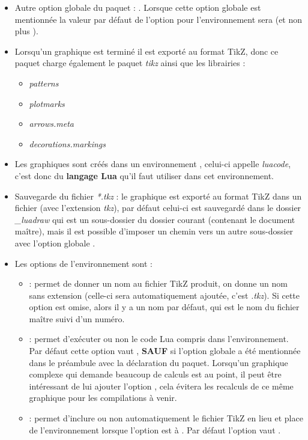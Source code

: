 \begin{itemize}
    \item Autre option globale du paquet : . Lorsque cette option globale est mentionnée la valeur par défaut de l'option  pour l'environnement \luadrawenv sera \false (et non plus \true).

    \item Lorsqu'un graphique est terminé il est exporté au format TikZ, donc ce paquet charge également le paquet \emph{tikz} ainsi que les librairies :
    \begin{itemize}
        \item\emph{patterns}
        \item\emph{plotmarks}
        \item\emph{arrows.meta}
        \item\emph{decorations.markings}
        \end{itemize}
        
    \item Les graphiques sont créés dans un environnement \luadrawenv, celui-ci appelle \emph{luacode}, c'est donc du \textbf{langage Lua} qu'il faut utiliser dans cet environnement.

    \item Sauvegarde du fichier \emph{*.tkz} : le graphique est exporté au format TikZ dans un fichier (avec l'extension \emph{tkz}), par défaut celui-ci est sauvegardé dans le dossier \emph{\_luadraw} qui est un sous-dossier du dossier courant (contenant le document maître), mais il est possible d'imposer un chemin vers un autre sous-dossier avec l'option globale .
    
    \item Les options de l'environnement sont :
    \begin{itemize}
    \item {} : permet de donner un nom au fichier TikZ produit, on donne un nom sans extension (celle-ci sera automatiquement ajoutée, c'est \emph{.tkz}). Si cette option est omise, alors il y a un nom par défaut, qui est le nom du fichier maître suivi d'un numéro.
    
    \item {} : permet d'exécuter ou non le code Lua compris dans l'environnement. Par défaut cette option vaut \true, \textbf{SAUF} si l'option globale  a été mentionnée dans le préambule avec la déclaration du paquet. Lorsqu'un graphique complexe qui demande beaucoup de calculs est au point, il peut être intéressant de lui ajouter l'option , cela évitera les recalculs de ce même graphique pour les compilations à venir.
    
    \item {} : permet d'inclure ou non automatiquement le fichier TikZ en lieu et place de l'environnement \luadrawenv lorsque l'option  est à \false. Par défaut l'option  vaut \true.
    \end{itemize}
\end{itemize}


